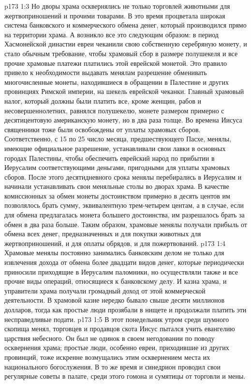\vs p173 1:3 \pc Но дворы храма осквернялись не только торговлей животными для жертвоприношений и прочими товарами. В это время процветала широкая система банковского и коммерческого обмена денег, который производился прямо на территории храма. А возникло все это следующим образом: в период Хасмонейской династии евреи чеканили свою собственную серебряную монету, и стало обычным требование, чтобы храмовый сбор в размере полушекеля и все прочие храмовые платежи платились этой еврейской монетой. Это правило привело к необходимости выдавать менялам разрешение обменивать многочисленные монеты, находившиеся в обращении в Палестине и других провинциях Римской империи, на шекель еврейской чеканки. Главный храмовый налог, который должны были платить все, кроме женщин, рабов и несовершеннолетних, равнялся полушекелю, монете размером примерно с десятицентовую американскую монету, но в два раза толще. Во времена Иисуса священники тоже были освобождены от уплаты храмовых сборов. Соответственно, с 15 по 25 число месяца, предшествующего Пасхе, менялы, имеющие официальное разрешение, устанавливали свои лавки в основных городах Палестины, чтобы обеспечить еврейский народ по прибытии в Иерусалим соответствующими деньгами, пригодными для уплаты храмовых сборов. После этого десятидневного срока менялы перебирались в Иерусалим и начинали устанавливать свои меняльные столы во дворах храма. В качестве комиссионных за обмен монеты достоинством примерно в десять центов им позволялось брать сумму, эквивалентную трем\hyp{}четырем центам, а в случае, если для обмена предлагалась монета большего достоинства, им разрешалось брать за обмен в два раза больше. Таким образом, храмовые менялы получали прибыль от обмена всех денег, предназначенных и для покупки животных для жертвоприношений, и для оплаты обрядов, и для пожертвований.
\vs p173 1:4 Храмовые менялы постоянно занимались банковским делом не только для извлечения дохода от обмена более двадцати видов денег, которые периодически приносили приходящие в Иерусалим паломники, но осуществляли также и все прочие виды операций, относящиеся к банковскому делу. И казна храма, и управители храма получали громадный доход от этой коммерческой деятельности. В храмовой казне нередко бывало свыше десяти миллионов долларов, тогда как простые люди прозябали в нищете и продолжали платить эти несправедливые подати.
\vs p173 1:5 \pc В этот понедельник утром среди шумного скопища менял, торговцев и продавцов скота Иисус пытался учить евангелию царствия небесного. Он был не одинок в своем негодовании по поводу осквернения храма; простые люди, особенно евреи, приходившие из других провинций, тоже искренне возмущались этим осквернением места их национального богослужения. В то же время и синедрион проводил свои регулярные советы в палате, среди этого гомона и сумятицы от торговли и мены.
